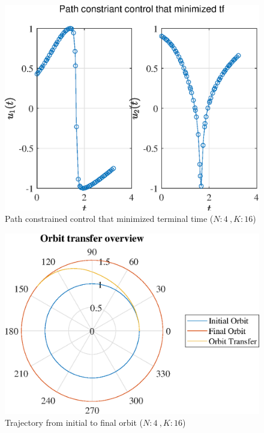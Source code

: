 \documentclass[]{article}
\begin{document}
	\begin{figure}
		\centering
		\includegraphics[scale=0.75]{path_N4_K16_C3_tf.eps}
		\caption{Path constrained control that minimized terminal time (\(N:4\ , K:16\))}
		\label{fig:path_N4_K16_C3_tf}
	\end{figure}
	\begin{figure}
		\centering
		\includegraphics[scale=0.75]{orbit_N4_K16_C3_tf.eps}
		\caption{Trajectory from initial to final orbit (\(N:4\ , K:16\))}
		\label{fig:orbit_N4_K16_C3_tf}
	\end{figure}
\end{document}
